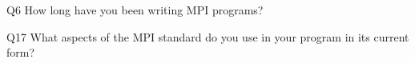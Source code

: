 \begin{description}%
\item{Q6} How long have you been writing MPI programs?%
\item{Q17} What aspects of the MPI standard do you use in your program in its current form?%
\end{description}%
